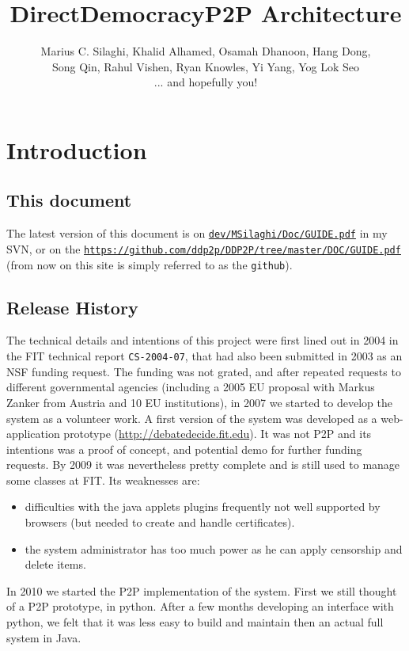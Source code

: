\documentclass{book}
\title{DirectDemocracyP2P Architecture}
\author{Marius C. Silaghi, Khalid Alhamed, Osamah Dhanoon, Hang Dong,\\
 Song Qin, Rahul Vishen, Ryan Knowles, Yi Yang, Yog Lok Seo \\
... and hopefully you!}
\begin{document}
\maketitle
\chapter{Introduction}
\section{This document}
The latest version of this document is on {\tt \url{dev/MSilaghi/Doc/GUIDE.pdf}} in my SVN, or on the {\tt \url{https://github.com/ddp2p/DDP2P/tree/master/DOC/GUIDE.pdf}} (from now on this site is simply referred to as the {\tt github}).

\section{Release History}

The technical details and intentions of this project were first lined out in 2004 in the FIT technical report {\tt CS-2004-07}, that had also been  submitted in 2003 as an NSF funding request.
The funding was not grated, and after repeated requests to different governmental agencies (including a 2005 EU proposal with Markus Zanker from Austria and 10 EU institutions), 
in 2007 we started to develop the system as a volunteer work.
A first version of the system was developed as a web-application prototype (\url{http://debatedecide.fit.edu}). It was not P2P and its intentions was a proof of concept,
and potential demo for further funding requests. By 2009 it was nevertheless pretty complete and is still used to manage some classes at FIT. Its weaknesses are:
\begin{itemize}
\item
difficulties with the java applets plugins frequently not well supported by browsers (but needed to create and handle certificates).
\item
the system administrator has too much power as he can apply censorship and delete items.
\end{itemize}

In 2010 we started the P2P implementation of the system. First we still thought of a P2P prototype, in python. After a few months developing an interface with python,
we felt that it was less easy to build and maintain then an actual full system in Java.
\end{document}
